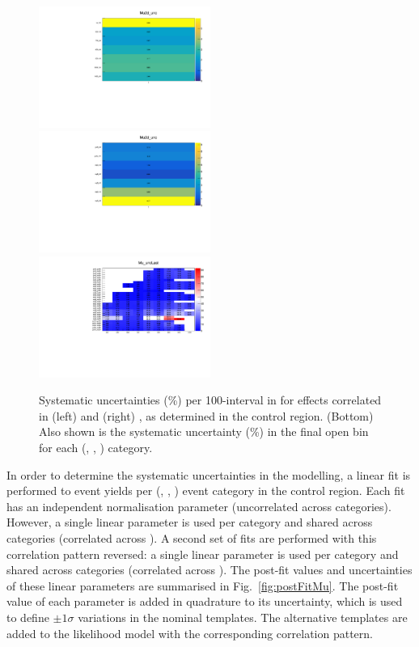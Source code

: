 \begin{figure}[h!]
  \centering
  \includegraphics[width=0.5\textwidth]{figures/mhtTemplate/exclusive_corr_njet/Mu_2D_unc}~
  \includegraphics[width=0.5\textwidth]{figures/mhtTemplate/exclusive_corr_ht/Mu_2D_unc}\\
  \includegraphics[width=0.5\textwidth]{figures/mhtTemplate/exclusive_corr_ht/Mu_uncLast}\\
  \caption{\label{fig:postFitErrMu} Systematic uncertainties (\%) per
    100\GeV-interval in \mht for effects correlated in (left) \njet
    and (right) \scalht, as determined in the \mj control
    region. (Bottom) Also shown is the systematic uncertainty (\%) in
    the final open \mht bin for each (\njet, \scalht, \nb) category.}
\end{figure}

In order to determine the systematic uncertainties in the \mht
modelling, a linear fit is performed to event yields per (\njet,
\scalht, \nb) event category in the \mj control region. Each fit has
an independent normalisation parameter (\ie uncorrelated across
categories). However, a single linear parameter is used per \scalht
category and shared across \njet categories (\ie correlated across
\njet). A second set of fits are performed with this correlation
pattern reversed: a single linear parameter is used per \njet category
and shared across \scalht categories (\ie correlated across
\scalht). The post-fit values and uncertainties of these linear
parameters are summarised in Fig.~\ref{fig:postFitMu}. The post-fit
value of each parameter is added in quadrature to its uncertainty,
which is used to define $\pm 1\sigma$ variations in the nominal
templates. The alternative templates are added to the likelihood model
with the corresponding correlation pattern.

